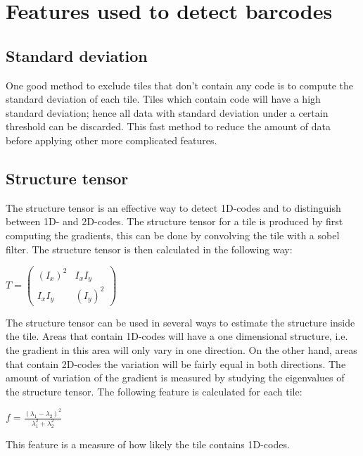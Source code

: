 \chapter{Features used to detect barcodes}
\label{sec:Features used to detect barcodes}

\section{Standard deviation}
\label{sec:Standard deviation}
One good method to exclude tiles that don't contain any code is to compute the standard deviation of each tile. Tiles which contain code will have a high standard deviation; hence all data with standard deviation under a certain threshold can be discarded. This fast method to reduce the amount of data before applying other more complicated features. 

\section{Structure tensor}
\label{sec:Structure tensor}
The structure tensor is an effective way to detect 1D-codes and to distinguish between 1D- and 2D-codes. The structure tensor for a tile is produced by first computing the gradients, this can be done by convolving the tile with a sobel filter. The structure tensor is then calculated in the following way:
\begin{center}
\begin{math}
	T = \begin{pmatrix}
			(I_{x})^2 & I_{x}I_{y} \\ I_{x}I_{y} & (I_{y})^2
		\end{pmatrix}
\end{math}
\end{center}
The structure tensor can be used in several ways to estimate the structure inside the tile. Areas that contain 1D-codes will have a one dimensional structure, i.e. the gradient in this area will only vary in one direction. On the other hand, areas that contain 2D-codes the variation will be fairly equal in both directions. The amount of variation of the gradient is measured by studying the eigenvalues of the structure tensor. The following feature is calculated for each tile:
\begin{center}
\begin{math}
f = \frac{(\lambda_1 - \lambda_2)^2}{\lambda_1^2+\lambda_2^2}
\end{math}
\end{center}
This feature is a measure of how likely the tile contains 1D-codes.

